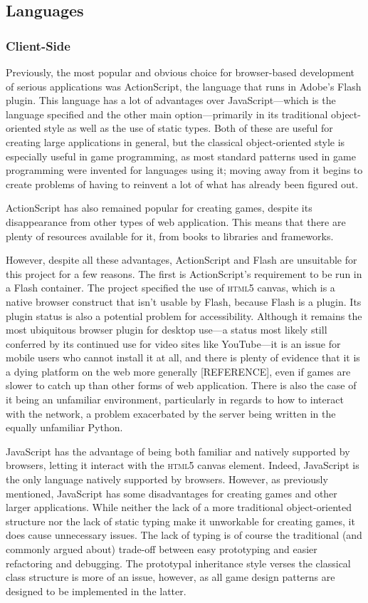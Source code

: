 \subsection{Languages}
\subsubsection{Client-Side}
Previously, the most popular and obvious choice for browser-based development of serious applications was ActionScript, the language that runs in Adobe's Flash plugin. This language has a lot of advantages over JavaScript---which is the language specified and the other main option---primarily in its traditional object-oriented style as well as the use of static types. Both of these are useful for creating large applications in general, but the classical object-oriented style is especially useful in game programming, as most standard patterns used in game programming were invented for languages using it; moving away from it begins to create problems of having to reinvent a lot of what has already been figured out.

ActionScript has also remained popular for creating games, despite its disappearance from other types of web application. This means that there are plenty of resources available for it, from books to libraries and frameworks.

However, despite all these advantages, ActionScript and Flash are unsuitable for this project for a few reasons. The first is ActionScript's requirement to be run in a Flash container. The project specified the use of \textsc{html5} canvas, which is a native browser construct that isn't usable by Flash, because Flash is a plugin. Its plugin status is also a potential problem for accessibility. Although it remains the most ubiquitous browser plugin for desktop use---a status most likely still conferred by its continued use for video sites like YouTube---it is an issue for mobile users who cannot install it at all, and there is plenty of evidence that it is a dying platform on the web more generally [REFERENCE], even if games are slower to catch up than other forms of web application. There is also the case of it being an unfamiliar environment, particularly in regards to how to interact with the network, a problem exacerbated by the server being written in the equally unfamiliar Python.

JavaScript has the advantage of being both familiar and natively supported by browsers, letting it interact with the \textsc{html5} canvas element. Indeed, JavaScript is the only language natively supported by browsers. However, as previously mentioned, JavaScript has some disadvantages for creating games and other larger applications. While neither the lack of a more traditional object-oriented structure nor the lack of static typing make it unworkable for creating games, it does cause unnecessary issues. The lack of typing is of course the traditional (and commonly argued about) trade-off between easy prototyping and easier refactoring and debugging. The prototypal inheritance style verses the classical class structure is more of an issue, however, as all game design patterns are designed to be implemented in the latter.

